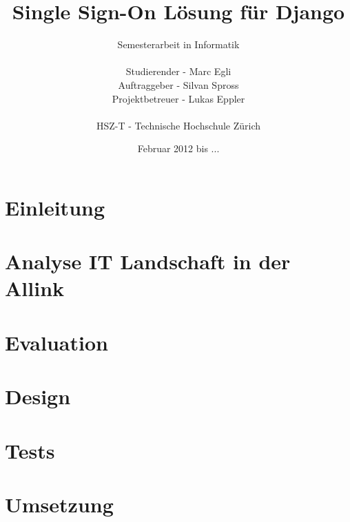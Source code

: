 \documentclass[
11pt, %
a4paper, %
BCOR10mm, %
DIV14, %
footsepline = false, %
headsepline, %
oneside, %
openright,
halfparskip, %
abstracton, %
listof=totocnumbered, %
bibliography=totocnumbered %
]{scrreprt}
\title{Single Sign-On Lösung für Django}
\author{Semesterarbeit in Informatik\\
    \\
    Studierender - Marc Egli\\
	Auftraggeber - Silvan Spross\\
    Projektbetreuer - Lukas Eppler\\
	\\
	HSZ-T - Technische Hochschule Zürich}
\date{Februar 2012 bis ...}
\begin{document}
  \ifpdf
  \else
  \fi

  
  \maketitle
  

  
  \tableofcontents
  
  
  \chapter{Einleitung}
  \label{cha:Einleitung}
  
  
  \chapter{Analyse IT Landschaft in der Allink}
  \label{cha:Analyse IT Landschaft in der Allink}
  
  
  
  \chapter{Evaluation}
  \label{cha:Evaluation}
  

  \chapter{Design}
  \label{cha:Design}
  
  
  \chapter{Tests}
  \label{cha:Tests}
  
  
  \chapter{Umsetzung}
  \label{cha:Umsetzung}
  
  
  \appendix
  \listoffigures
  \listoftables
  
  \glsaddall
  \printglossaries
  
  \nocite{*}
  
  
\end{document}
